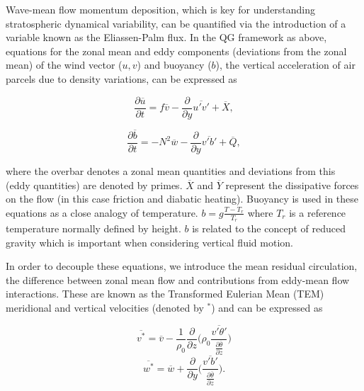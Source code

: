 Wave-mean flow momentum deposition, which is key for understanding stratospheric dynamical variability, can be quantified via the introduction of a variable known as the Eliassen-Palm flux. In the QG framework as above, equations for the zonal mean and eddy components (deviations from the zonal mean) of the wind vector ($u, v$) and buoyancy ($b$), the vertical acceleration of air parcels due to density variations, can be expressed as 

\begin{equation} \label{eq:QG_Ubar}
\frac{\partial \overline{u}}{\partial t} = f\overline{v} - \frac{\partial}{\partial y} \overline{u'v'} + \overline{X}, 
\end{equation}

\begin{equation} \label{eq:QG_theta}
\frac{\partial \overline{b}}{\partial t} = -N^2\overline{w} - \frac{\partial}{\partial y} \overline{v'b'} + \overline{Q}, 
\end{equation}

\noindent where the overbar denotes a zonal mean quantities and deviations from this (eddy quantities) are denoted by primes. $\overline{X}$ and $\overline{Y}$ represent the dissipative forces on the flow (in this case friction and diabatic heating). Buoyancy is used in these equations as a close analogy of temperature. $b = g\frac{T - T_r}{T_r}$ where $T_r$ is a reference temperature normally defined by height. $b$ is related to the concept of reduced gravity which is important when considering vertical fluid motion. 

In order to decouple these equations, we introduce the mean residual circulation, the difference between zonal mean flow and contributions from eddy-mean flow interactions. These are known as the Transformed Eulerian Mean (TEM) meridional and vertical velocities \citep{andrewsPlanetary1976} (denoted by $^*$) and can be expressed as 

\begin{equation} \label{eq:V*}
\overline{v^*} = \overline{v} - \frac{1}{\rho_0}\frac{\partial}{\partial z} \bigg(\rho_0 \frac{\overline{v'\theta'}}{\frac{\partial{\overline{\theta}}}{\partial{z}}}\bigg)
\end{equation}\break
\begin{equation} \label{eq:W*}
\overline{w^*} = \overline{w} + \frac{\partial}{\partial y} \bigg( \frac{\overline{v'b'}}{\frac{\partial{\overline{\theta}}}{\partial{z}}}\bigg).
\end{equation}

